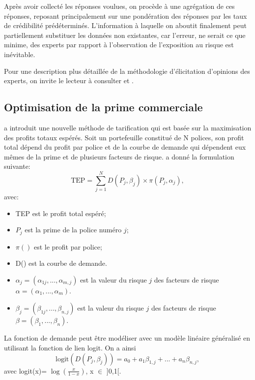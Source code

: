\documentclass[11pt]{article}
\begin{document}
Après avoir collecté les réponses voulues, on procède à une agrégation de ces réponses, reposant principalement sur une pondération des réponses par les taux de crédibilité prédéterminés. L'information à laquelle on aboutit finalement peut partiellement substituer les données non existantes, car l'erreur, ne serait ce que minime, des experts par rapport à l'observation de l'exposition au risque est inévitable.

Pour une description plus détaillée de la méthodologie d'élicitation d'opinions des experts, on invite le lecteur à consulter \cite{cooke} et \cite{o'hagan}.

\subsection{Optimisation de la prime commerciale}
\cite{krikler2004method} a introduit une nouvelle méthode de tarification qui est basée sur la maximisation des profits totaux espérés. Soit un portefeuille constitué de N polices, son profit total dépend du profit par police et de la courbe de demande qui dépendent eux mêmes de la prime et de plusieurs facteurs de risque. \cite{parodi2014pricing} a donné la formulation suivante:
\begin{equation}
\text{TEP}=\sum_{j=1}^{N}D(P_{j},\beta_{j})\times \pi(P_{j},\alpha_{j}),\nonumber
\end{equation}
avec:
\begin{itemize}
\item TEP est le profit total espéré;
\item $P_{j}$ est la prime de la police numéro $j$;
\item $\pi()$ est le profit par police;
\item D() est la courbe de demande.
\item $\alpha_{j}=(\alpha_{1j},...,\alpha_{m,j})$ est la valeur du risque $j$ des facteurs de risque $\alpha=(\alpha_{1},...,\alpha_{m})$.
\item $\beta_{j}=(\beta_{1j},...,\beta_{n,j})$ est la valeur du risque $j$ des facteurs de risque $\beta=(\beta_{1},...,\beta_{n})$.
\end{itemize}
La fonction de demande peut être modéliser avec un modèle linéaire généralisé en utilisant la fonction de lien logit. On a ainsi
\begin{equation}
\text{logit}(D(P_{j},\beta_{j}))=a_{0} + a_{1}\beta_{1,j} +...+ a_{n}\beta_{n,j},\nonumber
\end{equation}
avec logit(x)= $\log(\frac{x}{1-x})$, x $\in$ ]0,1[.
\end{document}
